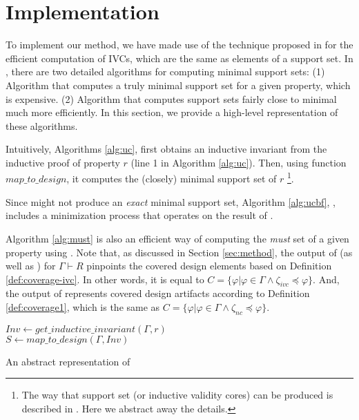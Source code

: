 \section{Implementation}
\label{sec:impl}

To implement our method, we have made use of the technique proposed in \cite{Ghass16} for the efficient computation of IVCs, which are the same as elements of a support set. In \cite{Ghass16}, there are two detailed algorithms for computing minimal support sets: (1) Algorithm \ucbfalg that computes a truly minimal support set for a given property, which is expensive. (2) Algorithm \ucalg that computes support sets fairly close to minimal much more efficiently. In this section, we provide a high-level representation of these algorithms.

Intuitively, Algorithms \ref{alg:uc},
first obtains an inductive invariant from the inductive proof of
property $r$ (line 1 in Algorithm \ref{alg:uc}). Then, using function $map\_to\_design$, it
computes the (closely) minimal support set of $r$ \footnote{The way that support set
(or inductive validity cores) can be produced is described in \cite{Ghass16}. Here we abstract away the details.}.

Since \ucalg might not produce an \emph{exact} minimal support set,
Algorithm \ref{alg:ucbf}, \ucbfalg, includes a minimization process that
operates on the result of \ucalg.

Algorithm \ref{alg:must} is also an efficient way of computing the \emph{must} set of a given property using \ucalg. Note that, as discussed in Section \ref{sec:method}, the
output of \ucalg (as well as \ucbfalg) for $\Gamma \vdash R$ pinpoints the covered design elements
based on Definition \ref{def:coverage-ivc}.
In other words, it is equal to
$C = \{\varphi | \varphi \in \Gamma \wedge  \zeta_{ivc} \preccurlyeq \varphi \}$.
And, the output of \mustalg represents covered design artifacts according to Definition \ref{def:coverage1}, which is the same as $C = \{\varphi | \varphi \in \Gamma \wedge \zeta_{nc} \preccurlyeq \varphi \}$.

\begin{algorithm}
  \BlankLine
  $Inv \leftarrow get\_inductive\_invariant(\Gamma, r)$ \\
  $S \leftarrow map\_to\_design (\Gamma, Inv)$ \\
\caption{An abstract representation of \ucalg \cite{Ghass16}}
\label{alg:uc}
\end{algorithm}

